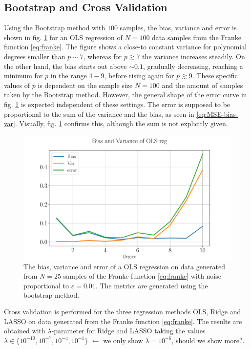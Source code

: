 \documentclass[%
reprint,
amsmath,amssymb,
aps,
pra,
]{revtex4-2}
\begin{document}
\subsection{Bootstrap and Cross Validation}
Using the Bootstrap method with \(100\) samples, the bias, variance and error is shown in fig. \ref{fig:bootstrap} for an OLS regression of \(N=100\) data samples from the Franke function \eqref{eq:franke}. The figure shows a close-to constant variance for polynomial degrees smaller than \(p\sim7\), whereas for \(p\gtrsim 7\) the variance increases steadily. On the other hand, the bias starts out above \(\sim0.1\), gradually decreasing, reaching a minimum for \(p\) in the range \(4-9\), before rising again for \(p\gtrsim 9\). These specific values of \(p\) is dependent on the sample size \(N=100\) and the amount of samples taken by the Bootstrap method. However, the general shape of the error curve in fig. \ref{fig:bootstrap} is expected independent of these settings. The error is supposed to be proportional to the sum of the variance and the bias, as seen in \eqref{eq:MSE-bias-var}. Visually, fig. \ref{fig:bootstrap} confirms this, although the sum is not explicitly given. 



\begin{figure}[ht!]
	\centering
	\includegraphics[width=\linewidth]{Python/Figures/OLS/OLS_Bootstrap_BiasVar_no_scaling_GOOD.pdf}
	\caption{The bias, variance and error of a OLS regression on data generated from \(N=25\) samples of the Franke function \eqref{eq:franke} with noise proportional to \(\varepsilon=0.01\). The metrics are generated using the bootstrap method.}
	\label{fig:bootstrap}
\end{figure}
Cross validation is performed for the three regression methods OLS, Ridge and LASSO on data generated from the Franke function \eqref{eq:franke}. The results are obtained with \(\lambda\)-parameter for Ridge and LASSO taking the values \(\lambda \in\{ 10^{-10}, 10^{-7}, 10^{-4}, 10^{-1}\}\) \color{red}\(\leftarrow\) we only show \(\lambda=10^{-6}\), should we show more?\color{black}.
\end{document}
